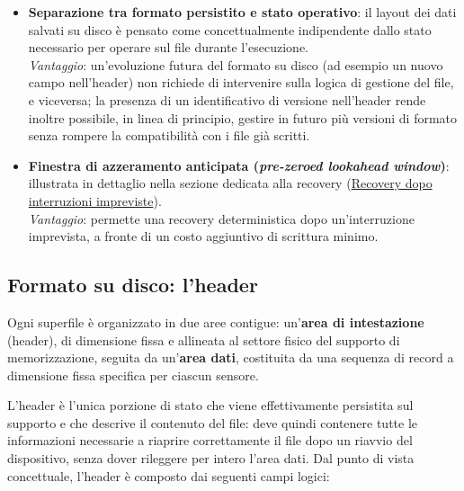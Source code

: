 \begin{itemize}
    \item \textbf{Separazione tra formato persistito e stato operativo}: il layout dei dati salvati su disco è pensato come concettualmente indipendente
    dallo stato necessario per operare sul file durante l'esecuzione.\\
    \textit{Vantaggio}: un'evoluzione futura del formato su disco (ad esempio un nuovo
    campo nell'header) non richiede di intervenire sulla logica di gestione del file, e viceversa; la presenza di un identificativo di versione nell'header
    rende inoltre possibile, in linea di principio, gestire in futuro più versioni di formato senza rompere la compatibilità con i file già scritti.

    \item \textbf{Finestra di azzeramento anticipata (\emph{pre-zeroed lookahead window})}: illustrata in dettaglio nella sezione dedicata alla recovery
    (\hyperref[subsec:Recovery]{Recovery dopo interruzioni impreviste}). \\
    \textit{Vantaggio}: permette una recovery deterministica dopo un'interruzione imprevista, a fronte di un costo aggiuntivo di scrittura minimo.
\end{itemize}

\subsection{Formato su disco: l'header}

Ogni superfile è organizzato in due aree contigue: un'\textbf{area di intestazione} (header), di dimensione fissa e allineata al settore fisico
del supporto di memorizzazione, seguita da un'\textbf{area dati}, costituita da una sequenza di record a dimensione fissa specifica per ciascun sensore.

L'header è l'unica porzione di stato che viene effettivamente persistita sul supporto e che descrive il contenuto del file: deve quindi contenere
tutte le informazioni necessarie a riaprire correttamente il file dopo un riavvio del dispositivo, senza dover rileggere per intero l'area dati.
Dal punto di vista concettuale, l'header è composto dai seguenti campi logici:

